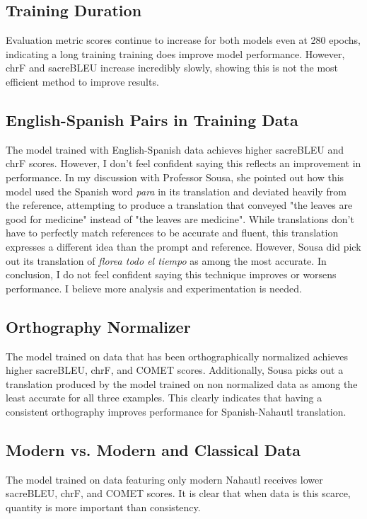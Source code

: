 \documentclass[10pt,twocolumn]{article}
\begin{document}
\subsection{Training Duration}
Evaluation metric scores continue to increase for both models even at 280 epochs, indicating a long training training does improve model performance. However, chrF and sacreBLEU increase incredibly slowly, showing this is not the most efficient method to improve results.

\subsection{English-Spanish Pairs in Training Data}
The model trained with English-Spanish data achieves higher sacreBLEU and chrF scores. However, I don't feel confident saying this reflects an improvement in performance. In my discussion with Professor Sousa, she pointed out how this model used the Spanish word \textit{para} in its translation and deviated heavily from the reference, attempting to produce a translation that conveyed "the leaves are good for medicine" instead of "the leaves are medicine". While translations don't have to perfectly match references to be accurate and fluent, this translation expresses a different idea than the prompt and reference. However, Sousa did pick out its translation of \textit{florea todo el tiempo} as among the most accurate. In conclusion, I do not feel confident saying this technique improves or worsens performance. I believe more analysis and experimentation is needed.

\subsection{Orthography Normalizer}
The model trained on data that has been orthographically normalized achieves higher sacreBLEU, chrF, and COMET scores. Additionally, Sousa picks out a translation produced by the model trained on non normalized data as among the least accurate for all three examples. This clearly indicates that having a consistent orthography improves performance for Spanish-Nahautl translation. 

\subsection{Modern vs. Modern and Classical Data}
The model trained on data featuring only modern Nahautl receives lower sacreBLEU, chrF, and COMET scores. It is clear that when data is this scarce, quantity is more important than consistency. 
\end{document}

